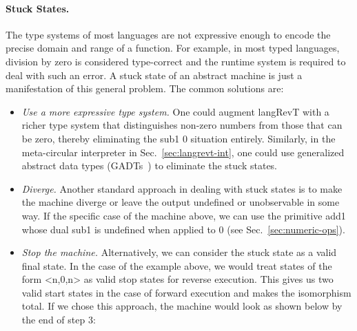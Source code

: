 \documentclass{llncs}
\begin{document}
\paragraph*{Stuck States.}
The type systems of most languages are not expressive enough to encode the
precise domain and range of a function. For example, in most typed languages,
division by zero is considered type-correct and the runtime system is
required to deal with such an error. A stuck state of an abstract machine is
just a manifestation of this general problem. The common solutions are:
\begin{itemize}
\item \emph{Use a more expressive type system.}  One could augment
  {{langRevT}} with a richer type system that distinguishes non-zero numbers
  from those that can be zero, thereby eliminating the {{sub1 0}} situation
  entirely. Similarly, in the meta-circular interpreter in
  Sec.~\ref{sec:langrevt-int}, one could use generalized abstract data types
  (GADTs~\cite{phantom,Xi:2003:GRD:604131.604150}) to eliminate the stuck
  states.

\item \emph{Diverge.}  Another standard approach in dealing with stuck states
  is to make the machine diverge or leave the output undefined or
  unobservable in some way. If the specific case of the machine above, we can
  use the primitive {{add1}} whose dual {{sub1}} is undefined when applied to
  {{0}} (see Sec.~\ref{sec:numeric-ops}).

\item \emph{Stop the machine.}  Alternatively, we can consider the stuck
  state as a valid final state. In the case of the example above, we would
  treat states of the form {{<n,0,n>}} as valid stop states for reverse
  execution. This gives us two valid start states in the case of forward
  execution and makes the isomorphism total. If we chose this approach, the
  machine would look as shown below by the end of {{step 3}}:


\begin{center}
\end{center}

\end{itemize}
\end{document}
